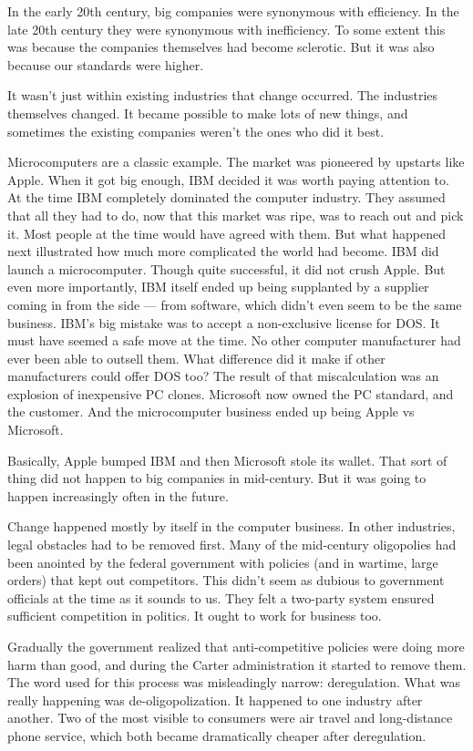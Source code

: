 In the early 20th century, big companies were synonymous with
efficiency.  In the late 20th century they were synonymous with
inefficiency.  To some extent this was because the companies
themselves had become sclerotic.  But it was also because our
standards were higher.

It wasn't just within existing industries that change occurred.
The industries themselves changed.  It became possible to make lots
of new things, and sometimes the existing companies weren't the
ones who did it best.

Microcomputers are a classic example. The market was pioneered by
upstarts like Apple. When it got big enough, IBM decided it was
worth paying attention to.  At the time IBM completely dominated
the computer industry. They assumed that all they had to do, now
that this market was ripe, was to reach out and pick it.  Most
people at the time would have agreed with them.  But what happened
next illustrated how much more complicated the world had become.
IBM did launch a microcomputer.  Though quite successful, it did
not crush Apple.  But even more importantly, IBM itself ended up
being supplanted by a supplier coming in from the side --- from
software, which didn't even seem to be the same business.  IBM's
big mistake was to accept a non-exclusive license for DOS.  It must
have seemed a safe move at the time.  No other computer manufacturer
had ever been able to outsell them. What difference did it make if
other manufacturers could offer DOS too?  The result of that
miscalculation was an explosion of inexpensive PC clones.  Microsoft
now owned the PC standard, and the customer.  And the microcomputer
business ended up being Apple vs Microsoft.

Basically, Apple bumped IBM and then Microsoft stole its wallet.
That sort of thing did not happen to big companies in mid-century.
But it was going to happen increasingly often in the future.

Change happened mostly by itself in the computer business.  In other
industries, legal obstacles had to be removed first.  Many of the
mid-century oligopolies had been anointed by the federal government
with policies (and in wartime, large orders) that kept out competitors.
This didn't seem as dubious to government officials at the time as
it sounds to us. They felt a two-party system ensured sufficient
competition in politics.  It ought to work for business too.

Gradually the government realized that anti-competitive policies
were doing more harm than good, and during the Carter administration
it started to remove them. The word used for this process was
misleadingly narrow: deregulation.  What was really happening was
de-oligopolization.  It happened to one industry after another.
Two of the most visible to consumers were air travel and long-distance
phone service, which both became dramatically cheaper after
deregulation.

